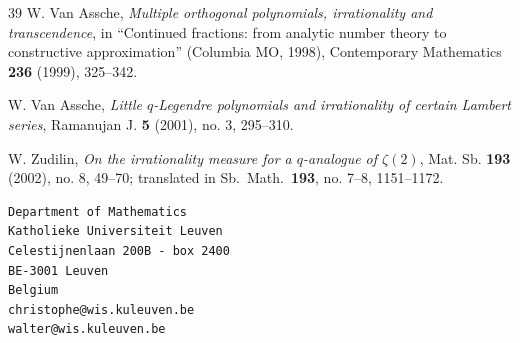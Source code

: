\documentclass[12pt]{article}
\numberwithin{equation}{section}
\begin{document}
\begin{thebibliography}{39}
 W. Van Assche,
\textit{Multiple orthogonal polynomials, irrationality and transcendence},
in ``Continued fractions: from analytic number theory to constructive approximation''
(Columbia MO, 1998), Contemporary Mathematics \textbf{236} (1999), 325--342.

 W. Van Assche,
\textit{Little $q$-Legendre polynomials and irrationality of certain
Lambert series}, Ramanujan J. \textbf{5} (2001), no. 3, 295--310.

 W. Zudilin,
\textit{On the irrationality measure for a $q$-analogue of
$\zeta(2)$}, Mat. Sb. \textbf{193} (2002), no. 8, 49--70;
translated in Sb.\ Math.\ \textbf{193}, no. 7--8, 1151--1172.
\end{thebibliography}

\begin{verbatim}
Department of Mathematics
Katholieke Universiteit Leuven
Celestijnenlaan 200B - box 2400
BE-3001 Leuven
Belgium
christophe@wis.kuleuven.be
walter@wis.kuleuven.be
\end{verbatim}
\end{document}
